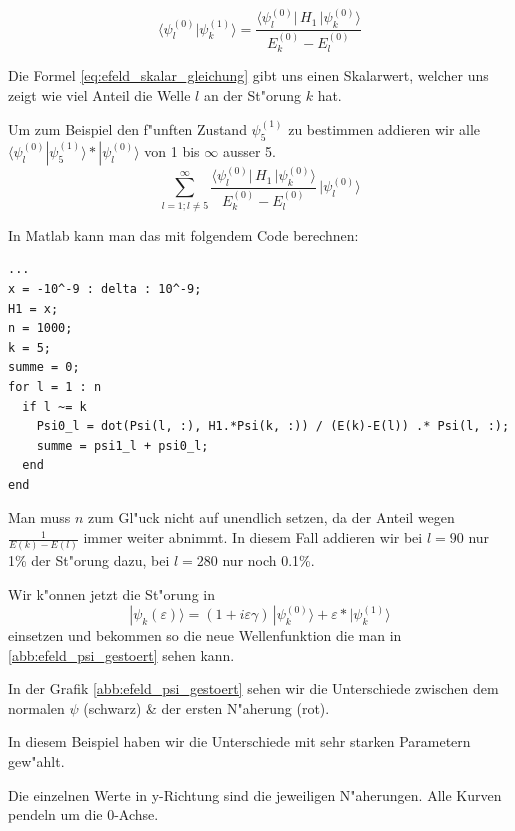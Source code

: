 \begin{refsection}
\begin{equation}
  \label{eq:efeld_skalar_gleichung}
  \langle\psi_l^{(0)}|\psi_k^{(1)}\rangle
      =
  \frac{\langle \psi_l^{(0)}|\, H_1 \,|\psi_k^{(0)}\rangle}{E_k^{(0)}-E_l^{(0)}}
\end{equation}

Die Formel \ref{eq:efeld_skalar_gleichung} gibt uns einen Skalarwert, welcher uns zeigt wie viel Anteil die Welle $l$ an der St"orung $k$ hat.

Um zum Beispiel den f"unften Zustand $\psi_5^{(1)}$ zu bestimmen addieren wir alle 
$\langle\psi_l^{(0)}|\psi_5^{(1)}\rangle*|\psi_l^{(0)}\rangle$
 von 1 bis $\infty$ ausser 5.
\begin{equation}
  \sum_{l=1 ; l\ne 5}^{\infty}
    \frac{\langle \psi_l^{(0)}|\, H_1 \,|\psi_k^{(0)}\rangle}{E_k^{(0)}-E_l^{(0)}}
        \,
    |\psi_l^{(0)}\rangle
\end{equation}

In Matlab kann man das mit folgendem Code berechnen:
\begin{lstlisting}[style=Matlab]
...
x = -10^-9 : delta : 10^-9;
H1 = x;
n = 1000;
k = 5;
summe = 0;
for l = 1 : n
  if l ~= k
    Psi0_l = dot(Psi(l, :), H1.*Psi(k, :)) / (E(k)-E(l)) .* Psi(l, :);
    summe = psi1_l + psi0_l;
  end
end
\end{lstlisting}

Man muss $n$ zum Gl"uck nicht auf unendlich setzen, da der Anteil wegen $\frac{1}{E(k)-E(l)}$ immer weiter abnimmt.
In diesem Fall addieren wir bei $l=90$ nur 1\% der St"orung dazu, bei $l=280$ nur noch 0.1\%.

Wir k"onnen jetzt die St"orung in 
\begin{equation}
|\psi_k(\varepsilon)\rangle
=
(1+i\varepsilon \gamma)
\,|\psi_k^{(0)}\rangle
+
\varepsilon*|\psi_k^{(1)}\rangle
\end{equation}
einsetzen und bekommen so die neue Wellenfunktion die man in \ref{abb:efeld_psi_gestoert} sehen kann.

In der Grafik \ref{abb:efeld_psi_gestoert} sehen wir die Unterschiede zwischen dem normalen $\psi$ (schwarz) \& der ersten N"aherung (rot).

In diesem Beispiel haben wir die Unterschiede mit sehr starken Parametern gew"ahlt.

Die einzelnen Werte in y-Richtung sind die jeweiligen N"aherungen. Alle Kurven pendeln um die 0-Achse.


\end{refsection}
